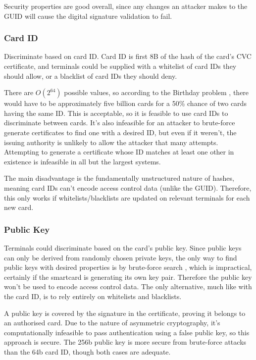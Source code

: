 \documentclass[12pt,a4paper]{article}
\begin{document}
Security properties are good overall, since any changes an attacker makes to the GUID will cause the digital signature validation to fail.


\subsubsection{Card ID}
Discriminate based on card ID. Card ID is first 8B of the hash of the card's CVC certificate, and terminals could be supplied with a whitelist of card IDs they should allow, or a blacklist of card IDs they should deny.

There are $O(2^{64})$ possible values, so according to the Birthday problem \cite{birthday}, there would have to be approximately five billion cards for a 50\% chance of two cards having the same ID. This is acceptable, so it is feasible to use card IDs to discriminate between cards. It's also infeasible for an attacker to brute-force generate certificates to find one with a desired ID, but even if it weren't, the issuing authority is unlikely to allow the attacker that many attempts. Attempting to generate a certificate whose ID matches at least one other in existence is infeasible in all but the largest systems.

The main disadvantage is the fundamentally unstructured nature of hashes, meaning card IDs can't encode access control data (unlike the GUID). Therefore, this only works if whitelists/blacklists are updated on relevant terminals for each new card.

\subsubsection{Public Key}
Terminals could discriminate based on the card's public key. Since public keys can only be derived from randomly chosen private keys, the only way to find public keys with desired properties is by brute-force search \cite{facebook_onion}, which is impractical, certainly if the smartcard is generating its own key pair. Therefore the public key won't be used to encode access control data. The only alternative, much like with the card ID, is to rely entirely on whitelists and blacklists.

A public key is covered by the signature in the certificate, proving it belongs to an authorised card. Due to the nature of asymmetric cryptography, it's computationally infeasible to pass authentication using a false public key, so this approach is secure. The 256b public key is more secure from brute-force attacks than the 64b card ID, though both cases are adequate.
\end{document}
